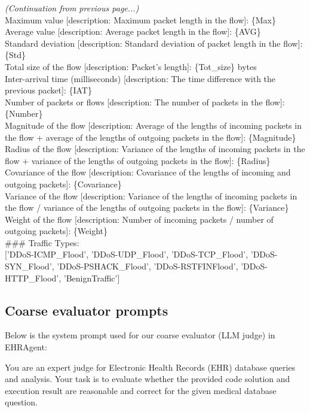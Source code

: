 \documentclass[11pt]{article}
\theoremstyle{plain}
\theoremstyle{definition}
\begin{document}
{\begin{tcolorbox}[userbox]
\textit{(Continuation from previous page...)}\\
Maximum value [description: Maximum packet length in the flow]: \{Max\} \\
Average value [description: Average packet length in the flow]: \{AVG\} \\
Standard deviation [description: Standard deviation of packet length in the flow]: \{Std\} \\
Total size of the flow [description: Packet’s length]: \{Tot\_size\} bytes \\
Inter-arrival time (milliseconds) [description: The time difference with the previous packet]: \{IAT\} \\
Number of packets or flows [description: The number of packets in the flow]: \{Number\} \\
Magnitude of the flow [description: Average of the lengths of incoming packets in the flow + average of the lengths of outgoing packets in the flow]: \{Magnitude\} \\
Radius of the flow [description: Variance of the lengths of incoming packets in the flow + variance of the lengths of outgoing packets in the flow]: \{Radius\} \\
Covariance of the flow [description: Covariance of the lengths of incoming and outgoing packets]: \{Covariance\} \\
Variance of the flow [description: Variance of the lengths of incoming packets in the flow / variance of the lengths of outgoing packets in the flow]: \{Variance\}\\
Weight of the flow [description: Number of incoming packets / number of outgoing packets]: \{Weight\} \\
\#\#\# Traffic Types: \\
\textnormal{['DDoS-ICMP\_Flood', 'DDoS-UDP\_Flood', 'DDoS-TCP\_Flood', 'DDoS-SYN\_Flood', 'DDoS-PSHACK\_Flood', 'DDoS-RSTFINFlood', 'DDoS-HTTP\_Flood', 'BenignTraffic']}
\end{tcolorbox}

\newpage
\subsection{Coarse evaluator prompts}\label{ap:coarse-evaluator-prompts}
Below is the system prompt used for our coarse evaluator (LLM judge) in EHRAgent:
\begin{tcolorbox}[systembox]
You are an expert judge for Electronic Health Records (EHR) database queries and analysis. Your task is to evaluate whether the provided code solution and execution result are reasonable and correct for the given medical database question.


\end{tcolorbox}}
\end{document}
